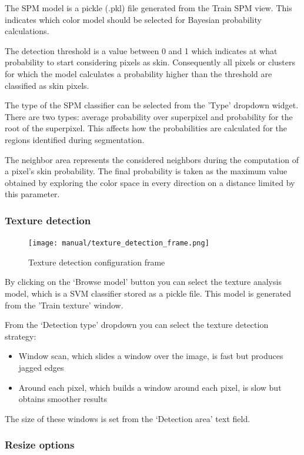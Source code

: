 \documentclass[12pt]{report}
\begin{document}
	The SPM model is a pickle (.pkl) file generated from the Train SPM view. This indicates which color model should be selected for Bayesian probability calculations. 
	
	The detection threshold is a value between 0 and 1 which indicates at what probability to start considering pixels as skin. Consequently all pixels or clusters for which the model calculates a probability higher than the threshold are classified as skin pixels.
	
	The type of the SPM classifier can be selected from the 'Type' dropdown widget.
	There are two types: average probability over superpixel and probability for the root of the superpixel. This affects how the probabilities are calculated for the regions identified during segmentation.
	
	The neighbor area represents the considered neighbors during the computation of a pixel's skin probability. The final probability is taken as the maximum value obtained by exploring the color space in every direction on a distance limited by this parameter. 
	
	\subsubsection{Texture detection}
	\begin{figure}
		\begin{center}
			\texttt{[image: manual/texture\_detection\_frame.png]}
		\end{center}
		\caption{Texture detection configuration frame}
	\end{figure}
	
	By clicking on the ‘Browse model’ button you can select the texture analysis model, which is a SVM classifier stored as a pickle file. This model is generated from the 'Train texture' window.
	
	From the ‘Detection type’ dropdown you can select the texture detection strategy:
	\begin{itemize}
		\item Window scan, which slides a window over the image, is fast but produces jagged edges
		\item Around each pixel, which builds a window around each pixel, is slow but obtains smoother results
	\end{itemize}
	
	The size of these windows is set from the ‘Detection area’ text field.
	
	\subsubsection{Resize options}
	
\end{document}
